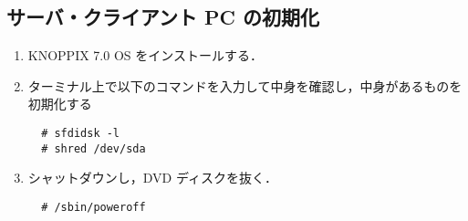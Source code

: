 \documentclass[a4j,titlepage]{jarticle}
\begin{document}
\begin{enumerate}
\begin{enumerate}
\end{enumerate}


\subsection{サーバ・クライアント PC の初期化}
\begin{enumerate}

\item KNOPPIX 7.0 OS をインストールする．

\item ターミナル上で以下のコマンドを入力して中身を確認し，中身があるものを初期化する

  \begin{center}
    \begin{screen}
\begin{verbatim}
  # sfdidsk -l
  # shred /dev/sda
\end{verbatim}
    \end{screen}
    \end{center}

    \item シャットダウンし，DVD ディスクを抜く．

  \begin{center}
    \begin{screen}
\begin{verbatim}
  # /sbin/poweroff 
\end{verbatim}
    \end{screen}
    \end{center}

\end{enumerate}
  
\end{document}
